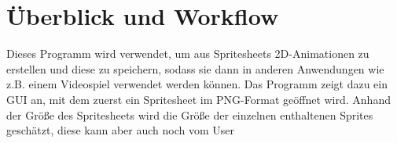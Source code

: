 \chapter{Überblick und Workflow}
Dieses Programm wird verwendet, um aus Spritesheets 2D-Animationen zu erstellen und diese zu speichern, sodass sie dann in anderen Anwendungen wie z.B. einem Videospiel verwendet werden können. Das Programm zeigt dazu ein GUI an, mit dem zuerst ein Spritesheet im PNG-Format geöffnet wird. Anhand der Größe des Spritesheets wird die Größe der einzelnen enthaltenen Sprites geschätzt, diese kann aber auch noch vom User 